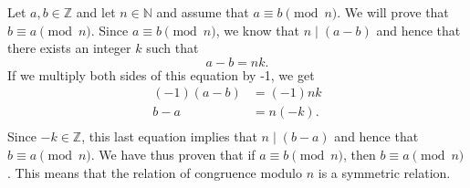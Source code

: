 \documentclass[11pt]{article}
\begin{document}
\begin{enumerate}
\begin{myproof}  Let  $a, b \in \mathbb{Z}$ and let  $n \in \mathbb{N}$ and assume that  
$a \equiv b \pmod n$.  We will prove that  $b \equiv a \pmod n$.  Since  
$a \equiv b \pmod n$, we know that  $n \mid \left( {a - b} \right)$ and hence that there exists an integer  $k$  such that 
\[
a - b = nk.
\]
If we multiply both sides of this equation by -1, we get
\[
\begin{aligned}
  \left( { - 1} \right)\left( {a - b} \right) &= \left( { - 1} \right)nk \\ 
                                        b - a &= n\left( { - k} \right). \\ 
\end{aligned}
\]
Since  $ - k \in \mathbb{Z}$, this last equation implies that  $n \mid \left( {b - a} \right)$ 
 and hence that  $b \equiv a \pmod n$.  We have thus proven that if  
$a \equiv b \pmod n$, then  $b \equiv a \pmod n$.  This means that the relation of congruence modulo  $n$  is a symmetric relation.
\end{myproof}
\hbreak
\end{enumerate}
\end{document}
